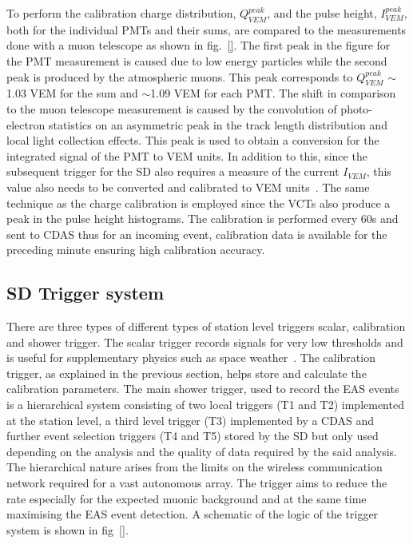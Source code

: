 To perform the calibration charge distribution, $Q_{VEM}^{peak}$, and the pulse height, $I_{VEM}^{peak}$, both for the individual PMTs and their sums, are compared to the measurements done with a muon telescope as shown in fig.~\ref{}. The first peak in the figure for the PMT measurement is caused due to low energy particles while the second peak is produced by the atmospheric muons. This peak corresponds to $Q_{VEM}^{peak}$ $\sim$ 1.03 VEM for the sum and $\sim$1.09 VEM for each PMT. The shift in comparison to the muon telescope measurement is caused by the convolution of photo-electron statistics on an asymmetric peak in the track length distribution and local light collection effects. This peak is used to obtain a conversion for the integrated signal of the PMT to VEM units. In addition to this, since the subsequent trigger for the SD also requires a measure of the current $I_{VEM}$, this value also needs to be converted and calibrated to VEM units~\cite{PierreAuger:2005znw}. The same technique as the charge calibration is employed since the VCTs also produce a peak in the pulse height histograms. The calibration is performed every 60s and sent to CDAS thus for an incoming event, calibration data is available for the preceding minute ensuring high calibration accuracy. 

\subsection{SD Trigger system}
\label{sec:Sur_det_trig}
There are three types of different types of station level triggers scalar, calibration and shower trigger. The scalar trigger records signals for very low thresholds and is useful for supplementary physics such as space weather~\cite{Dasso:2012vk}. The calibration trigger, as explained in the previous section, helps store and calculate the calibration parameters. The main shower trigger, used to record the EAS events is a hierarchical system consisting of two local triggers (T1 and T2) implemented at the station level, a third level trigger (T3) implemented by a CDAS and further event selection triggers (T4 and T5) stored by the SD but only used depending on the analysis and the quality of data required by the said analysis. The hierarchical nature arises from the limits on the wireless communication network required for a vast autonomous array. The trigger aims to reduce the rate especially for the expected muonic background and at the same time maximising the EAS event detection. A schematic of the logic of the trigger system is shown in fig~\ref{}. 

